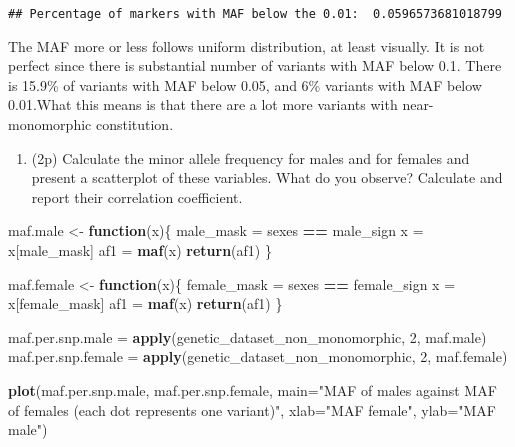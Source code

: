 \documentclass[
]{article}
\newenvironment{Shaded}{\begin{snugshade}}{\end{snugshade}}
\newcommand{\ControlFlowTok}[1]{\textcolor[rgb]{0.13,0.29,0.53}{\textbf{#1}}}
\newcommand{\DataTypeTok}[1]{\textcolor[rgb]{0.13,0.29,0.53}{#1}}
\newcommand{\DecValTok}[1]{\textcolor[rgb]{0.00,0.00,0.81}{#1}}
\newcommand{\KeywordTok}[1]{\textcolor[rgb]{0.13,0.29,0.53}{\textbf{#1}}}
\newcommand{\NormalTok}[1]{#1}
\newcommand{\OperatorTok}[1]{\textcolor[rgb]{0.81,0.36,0.00}{\textbf{#1}}}
\newcommand{\StringTok}[1]{\textcolor[rgb]{0.31,0.60,0.02}{#1}}
\providecommand{\tightlist}{%
  \setlength{\itemsep}{0pt}\setlength{\parskip}{0pt}}
\begin{document}
\begin{verbatim}
## Percentage of markers with MAF below the 0.01:  0.0596573681018799
\end{verbatim}

The MAF more or less follows uniform distribution, at least visually. It
is not perfect since there is substantial number of variants with MAF
below 0.1. There is 15.9\% of variants with MAF below 0.05, and 6\%
variants with MAF below 0.01.What this means is that there are a lot
more variants with near-monomorphic constitution.

\begin{enumerate}
\def\labelenumi{\arabic{enumi}.}
\setcounter{enumi}{6}
\tightlist
\item
  (2p) Calculate the minor allele frequency for males and for females
  and present a scatterplot of these variables. What do you observe?
  Calculate and report their correlation coefficient.
\end{enumerate}

\begin{Shaded}
\begin{Highlighting}[]
\NormalTok{maf.male <-}\StringTok{ }\ControlFlowTok{function}\NormalTok{(x)\{}
\NormalTok{  male_mask =}\StringTok{ }\NormalTok{sexes }\OperatorTok{==}\StringTok{ }\NormalTok{male_sign}
\NormalTok{  x =}\StringTok{ }\NormalTok{x[male_mask]}
\NormalTok{  af1 =}\StringTok{ }\KeywordTok{maf}\NormalTok{(x)}
  \KeywordTok{return}\NormalTok{(af1)}
\NormalTok{\}}

\NormalTok{maf.female <-}\StringTok{ }\ControlFlowTok{function}\NormalTok{(x)\{}
\NormalTok{  female_mask =}\StringTok{ }\NormalTok{sexes }\OperatorTok{==}\StringTok{ }\NormalTok{female_sign}
\NormalTok{  x =}\StringTok{ }\NormalTok{x[female_mask]}
\NormalTok{  af1 =}\StringTok{ }\KeywordTok{maf}\NormalTok{(x)}
  \KeywordTok{return}\NormalTok{(af1)}
\NormalTok{\}}

\NormalTok{maf.per.snp.male =}\StringTok{ }\KeywordTok{apply}\NormalTok{(genetic_dataset_non_monomorphic, }\DecValTok{2}\NormalTok{, maf.male)}
\NormalTok{maf.per.snp.female =}\StringTok{ }\KeywordTok{apply}\NormalTok{(genetic_dataset_non_monomorphic, }\DecValTok{2}\NormalTok{, maf.female)}

\KeywordTok{plot}\NormalTok{(maf.per.snp.male, maf.per.snp.female, }\DataTypeTok{main=}\StringTok{"MAF of males against MAF of females (each dot represents one variant)"}\NormalTok{, }\DataTypeTok{xlab=}\StringTok{"MAF female"}\NormalTok{, }\DataTypeTok{ylab=}\StringTok{"MAF male"}\NormalTok{)}
\end{Highlighting}
\end{Shaded}
\end{document}
